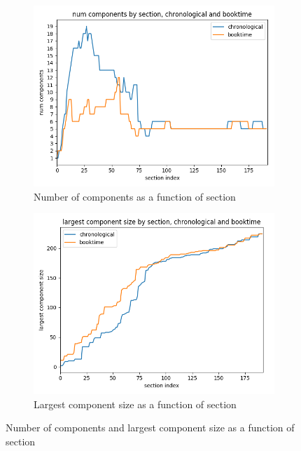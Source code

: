 \begin{figure}[ht!]
    \centering
    \begin{subfigure}{0.4\textwidth}
        \includegraphics[width=1.\textwidth]{images/dynamics-num-components.png}
        \caption{Number of components as a function of section}
    \end{subfigure}
    \begin{subfigure}{0.4\textwidth}
        \includegraphics[width=1.\textwidth]{images/dynamics-largest-components.png}
        \caption{Largest component size as a function of section}
    \end{subfigure}
    \caption{Number of components and largest component size as a function of section}
    \label{component-sizes}
\end{figure}

